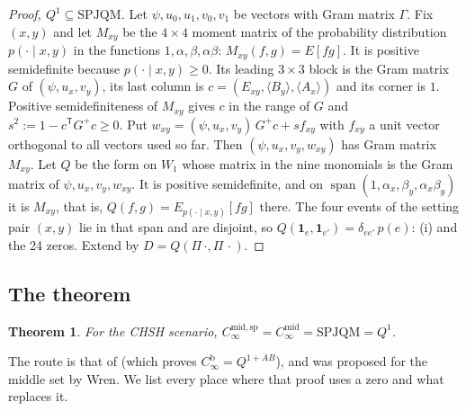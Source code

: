 \documentclass[11pt,a4paper]{article}
\newtheorem{theorem}{Theorem}
\theoremstyle{definition}
\theoremstyle{remark}
\newcommand{\ind}[1]{\mathbf{1}_{#1}}
\newcommand{\SPJQM}{\mathrm{SPJQM}}
\newcommand{\md}{\mathrm{mid}}
\newcommand{\br}{\mathrm{b}}
\begin{document}
\begin{proof}[Proof, $Q^1 \subseteq \SPJQM$]
Let $\psi, u_0, u_1, v_0, v_1$ be vectors with Gram matrix $\Gamma$. Fix $(x, y)$ and let $M_{xy}$ be the $4 \times 4$ moment matrix of the probability distribution $p(\cdot \mid x, y)$ in the functions $1, \alpha, \beta, \alpha\beta$: $M_{xy}(f, g) = E[f g]$. It is positive semidefinite because $p(\cdot \mid x, y) \ge 0$. Its leading $3 \times 3$ block is the Gram matrix $G$ of $(\psi, u_x, v_y)$, its last column is $c = (E_{xy}, \langle B_y \rangle, \langle A_x \rangle)$ and its corner is $1$. Positive semidefiniteness of $M_{xy}$ gives $c$ in the range of $G$ and $s^2 := 1 - c^{\mathsf T} G^{+} c \ge 0$. Put $w_{xy} = (\psi, u_x, v_y)\, G^{+} c + s f_{xy}$ with $f_{xy}$ a unit vector orthogonal to all vectors used so far. Then $(\psi, u_x, v_y, w_{xy})$ has Gram matrix $M_{xy}$. Let $Q$ be the form on $W_1$ whose matrix in the nine monomials is the Gram matrix of $\psi, u_x, v_y, w_{xy}$. It is positive semidefinite, and on $\operatorname{span}(1, \alpha_x, \beta_y, \alpha_x \beta_y)$ it is $M_{xy}$, that is, $Q(f, g) = E_{p(\cdot \mid x,y)}[f g]$ there. The four events of the setting pair $(x, y)$ lie in that span and are disjoint, so $Q(\ind{e}, \ind{e'}) = \delta_{ee'}\, p(e)$: (i) and the 24 zeros. Extend by $D = Q(\Pi\,\cdot, \Pi\,\cdot)$.
\end{proof}

\subsection{The theorem}

\begin{theorem}\label{t:mid}
For the CHSH scenario, $C_\infty^{\md,\mathrm{sp}} = C_\infty^{\md} = \SPJQM = Q^1$.
\end{theorem}

The route is that of \cite[Theorem 13]{R7} (which proves $C_\infty^{\br} = Q^{1+AB}$), and was proposed for the middle set by Wren. We list every place where that proof uses a zero and what replaces it.
\end{document}
